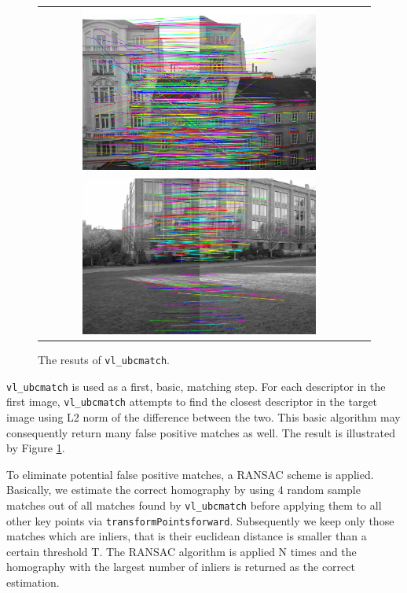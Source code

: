 \begin{figure}[h]
	\centering
	\begin{tabular}{cc}
	\includegraphics[width=0.75\textwidth]{figures/vl_ubcmatch1.png} \\
	\includegraphics[width=0.75\textwidth]{figures/vl_ubcmatch2.png} 

	\end{tabular}
	\caption{The resuts of \texttt{vl\_ubcmatch}. }
	\label{fig:a4:ubcmatch}
\end{figure}

\texttt{vl\_ubcmatch} is used as a first, basic, matching step. For each descriptor in the first image, \texttt{vl\_ubcmatch} attempts to find the closest descriptor in the target image using L2 norm of the difference between the two. This basic algorithm may consequently return many false positive matches as well. The result is illustrated by Figure \ref{fig:a4:ubcmatch}.

To eliminate potential false positive matches, a RANSAC scheme is applied. Basically, we estimate the correct homography  by using 4 random sample matches out of all matches found by \texttt{vl\_ubcmatch} before applying them to all other key points via \texttt{transformPointsforward}. Subsequently we keep only those matches which are inliers, that is their euclidean distance is smaller than a certain threshold T. The RANSAC algorithm is applied N times and the homography  with the largest number of inliers is returned as the correct estimation. 

